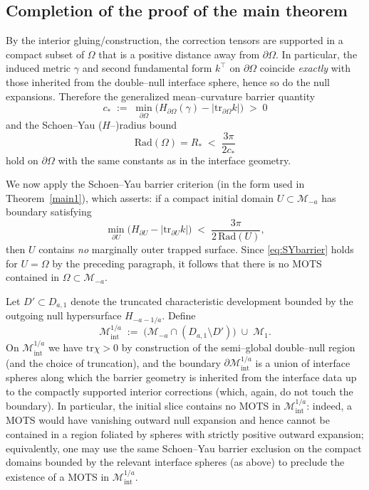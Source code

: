 \documentclass{amsart}
\newcommand{\tr}{\mbox{tr}}
\begin{document}
{\subsection{Completion of the proof of the main theorem}
\noindent
By the interior gluing/construction, the correction tensors are supported in a compact subset of $\Omega$ that is a positive distance away from $\partial\Omega$. In particular, the induced metric $\gamma$ and second fundamental form $k^\top$ on $\partial\Omega$ coincide \emph{exactly} with those inherited from the double--null interface sphere, hence so do the null expansions. Therefore the generalized mean--curvature barrier quantity
\[
c_* \;:=\; \min_{\partial\Omega}\Big(H_{\partial\Omega}(\gamma)-\big|\tr_{\partial\Omega}k\big|\Big)
\;>\;0
\]
and the Schoen--Yau ($H$--)radius bound
\[
\text{Rad}(\Omega)=R_* \;<\; \frac{3\pi}{2c_*}
\]
hold on $\partial\Omega$ with the same constants as in the interface geometry.

\noindent We now apply the Schoen--Yau barrier criterion (in the form used in Theorem~\ref{main1}), which asserts: if a compact initial domain $U\subset \mathcal M_{-a}$ has boundary satisfying
\begin{equation}\label{eq:SYbarrier}
\min_{\partial U}\big(H_{\partial U}-|\tr_{\partial U}k|\big)\;<\;\frac{3\pi}{2\,\text{Rad}(U)},
\end{equation}
then $U$ contains \emph{no} marginally outer trapped surface. Since \eqref{eq:SYbarrier} holds for $U=\Omega$ by the preceding paragraph, it follows that there is no MOTS contained in $\Omega\subset\mathcal M_{-a}$.

\medskip

\noindent
Let $D'\subset D_{a,1}$ denote the truncated characteristic development bounded by the outgoing null hypersurface $H_{-a-1/a}$. Define
\[
\mathcal M^{1/a}_{\mathrm{int}}
\;:=\;
\big(\mathcal M_{-a}\cap (D_{a,1}\setminus D')\big)\;\cup\;\mathcal M_{1}.
\]
On $\mathcal M^{1/a}_{\mathrm{int}}$ we have $\tr\chi>0$ by construction of the semi--global double--null region (and the choice of truncation), and the boundary $\partial\mathcal M^{1/a}_{\mathrm{int}}$ is a union of interface spheres along which the barrier geometry is inherited from the interface data up to the compactly supported interior corrections (which, again, do not touch the boundary). In particular, the initial slice contains no MOTS in $\mathcal M^{1/a}_{\mathrm{int}}$: indeed, a MOTS would have vanishing outward null expansion and hence cannot be contained in a region foliated by spheres with strictly positive outward expansion; equivalently, one may use the same Schoen--Yau barrier exclusion on the compact domains bounded by the relevant interface spheres (as above) to preclude the existence of a MOTS in $\mathcal M^{1/a}_{\mathrm{int}}$.

}
\end{document}
